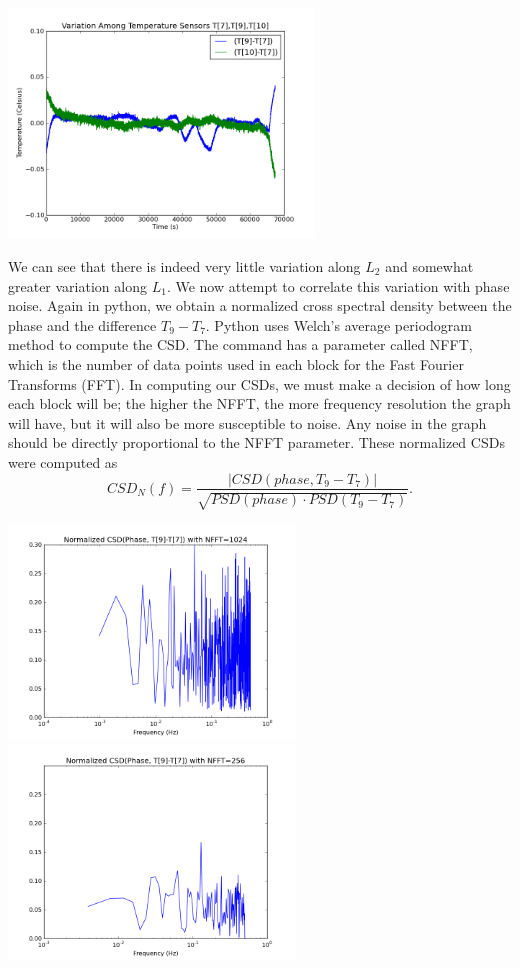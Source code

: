 \documentclass[11 pt]{article}
\begin{document}
\begin{center}\noindent\includegraphics[width=3.2in]{Tempdiff_7-9-10.png}\\\end{center}
We can see that there is indeed very little variation along $L_2$ and somewhat greater variation along $L_1$. We now attempt to correlate this variation with phase noise.
Again in python, we obtain a normalized cross spectral density between the phase and the difference $T_9-T_7$. Python uses Welch's average periodogram method to compute the CSD. The command has a parameter called NFFT, which is the number of data points used in each block for the Fast Fourier Transforms (FFT). In computing our CSDs, we must make a decision of how long each block will be; the higher the NFFT, the more frequency resolution the graph will have, but it will also be more susceptible to noise. Any noise in the graph should be directly proportional to the NFFT parameter. These normalized CSDs were computed as $$CSD_N(f)=\frac{|CSD(phase, T_9-T_7)|} { \sqrt{PSD(phase)\cdot PSD(T_9-T_7)}}.$$
\begin{center}\noindent\includegraphics[width=3in]{CSDNFFT1024.png}\includegraphics[width=3in]{CSDNFFT256.png}\end{center}
\end{document}
